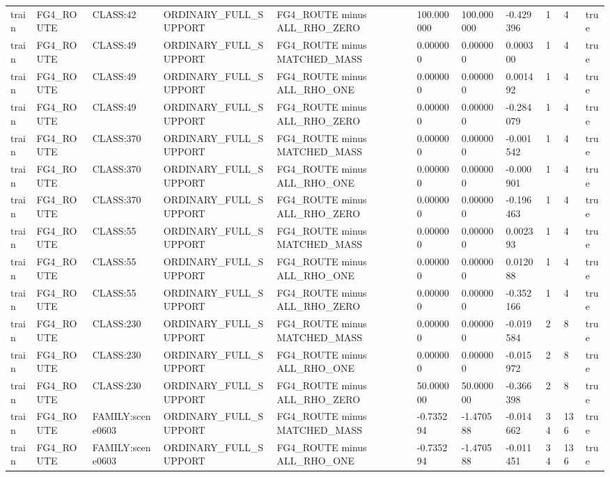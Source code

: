 \begin{tabular}{lllllllllll}
train & FG4\_ROUTE & CLASS:42 & ORDINARY\_FULL\_SUPPORT & FG4\_ROUTE minus ALL\_RHO\_ZERO & 100.000000 & 100.000000 & -0.429396 & 1 & 4 & true \\
train & FG4\_ROUTE & CLASS:49 & ORDINARY\_FULL\_SUPPORT & FG4\_ROUTE minus MATCHED\_MASS & 0.000000 & 0.000000 & 0.000300 & 1 & 4 & true \\
train & FG4\_ROUTE & CLASS:49 & ORDINARY\_FULL\_SUPPORT & FG4\_ROUTE minus ALL\_RHO\_ONE & 0.000000 & 0.000000 & 0.001492 & 1 & 4 & true \\
train & FG4\_ROUTE & CLASS:49 & ORDINARY\_FULL\_SUPPORT & FG4\_ROUTE minus ALL\_RHO\_ZERO & 0.000000 & 0.000000 & -0.284079 & 1 & 4 & true \\
train & FG4\_ROUTE & CLASS:370 & ORDINARY\_FULL\_SUPPORT & FG4\_ROUTE minus MATCHED\_MASS & 0.000000 & 0.000000 & -0.001542 & 1 & 4 & true \\
train & FG4\_ROUTE & CLASS:370 & ORDINARY\_FULL\_SUPPORT & FG4\_ROUTE minus ALL\_RHO\_ONE & 0.000000 & 0.000000 & -0.000901 & 1 & 4 & true \\
train & FG4\_ROUTE & CLASS:370 & ORDINARY\_FULL\_SUPPORT & FG4\_ROUTE minus ALL\_RHO\_ZERO & 0.000000 & 0.000000 & -0.196463 & 1 & 4 & true \\
train & FG4\_ROUTE & CLASS:55 & ORDINARY\_FULL\_SUPPORT & FG4\_ROUTE minus MATCHED\_MASS & 0.000000 & 0.000000 & 0.002393 & 1 & 4 & true \\
train & FG4\_ROUTE & CLASS:55 & ORDINARY\_FULL\_SUPPORT & FG4\_ROUTE minus ALL\_RHO\_ONE & 0.000000 & 0.000000 & 0.012088 & 1 & 4 & true \\
train & FG4\_ROUTE & CLASS:55 & ORDINARY\_FULL\_SUPPORT & FG4\_ROUTE minus ALL\_RHO\_ZERO & 0.000000 & 0.000000 & -0.352166 & 1 & 4 & true \\
train & FG4\_ROUTE & CLASS:230 & ORDINARY\_FULL\_SUPPORT & FG4\_ROUTE minus MATCHED\_MASS & 0.000000 & 0.000000 & -0.019584 & 2 & 8 & true \\
train & FG4\_ROUTE & CLASS:230 & ORDINARY\_FULL\_SUPPORT & FG4\_ROUTE minus ALL\_RHO\_ONE & 0.000000 & 0.000000 & -0.015972 & 2 & 8 & true \\
train & FG4\_ROUTE & CLASS:230 & ORDINARY\_FULL\_SUPPORT & FG4\_ROUTE minus ALL\_RHO\_ZERO & 50.000000 & 50.000000 & -0.366398 & 2 & 8 & true \\
train & FG4\_ROUTE & FAMILY:scene0603 & ORDINARY\_FULL\_SUPPORT & FG4\_ROUTE minus MATCHED\_MASS & -0.735294 & -1.470588 & -0.014662 & 34 & 136 & true \\
train & FG4\_ROUTE & FAMILY:scene0603 & ORDINARY\_FULL\_SUPPORT & FG4\_ROUTE minus ALL\_RHO\_ONE & -0.735294 & -1.470588 & -0.011451 & 34 & 136 & true \\

\end{tabular}

